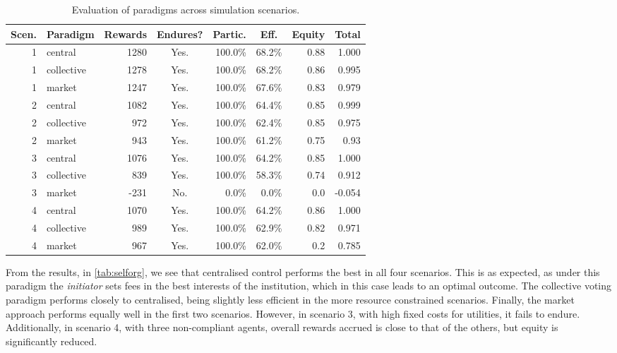 \begin{table}
\centering
\caption[Evaluation of paradigms across simulation scenarios.]{Evaluation of paradigms across simulation scenarios.}\label{tab:selforg}
\begin{tabular}{rl|rcrrr|r}
\multicolumn{1}{c}{Scen.} & Paradigm & \multicolumn{1}{c}{Rewards} & \multicolumn{1}{c}{Endures?} & \multicolumn{1}{c}{Partic.} & \multicolumn{1}{c}{Eff.} & Equity & \multicolumn{1}{c}{Total} \\
\hline \hline
1 & central & 1280 & Yes. & 100.0\% & 68.2\% & 0.88 & 1.000 \\
1 & collective & 1278 & Yes. & 100.0\% & 68.2\% & 0.86 & 0.995 \\
1 & market & 1247 & Yes. & 100.0\% & 67.6\% & 0.83 & 0.979 \\
\hline
2 & central & 1082 & Yes. & 100.0\% & 64.4\% & 0.85 & 0.999 \\
2 & collective & 972 & Yes. & 100.0\% & 62.4\% & 0.85 & 0.975 \\
2 & market & 943 & Yes. & 100.0\% & 61.2\% & 0.75 & 0.93 \\
\hline
3 & central & 1076 & Yes. & 100.0\% & 64.2\% & 0.85 & 1.000 \\
3 & collective & 839 & Yes. & 100.0\% & 58.3\% & 0.74 & 0.912 \\
3 & market & -231 & No. & 0.0\% & 0.0\% & 0.0 & -0.054 \\
\hline
4 & central & 1070 & Yes. & 100.0\% & 64.2\% & 0.86 & 1.000 \\
4 & collective & 989 & Yes. & 100.0\% & 62.9\% & 0.82 & 0.971 \\
4 & market & 967 & Yes. & 100.0\% & 62.0\% & 0.2 & 0.785 \\
\end{tabular}
\end{table}

From the results, in \autoref{tab:selforg}, we see that centralised control
performs the best in all four scenarios. This is as expected, as under this
paradigm the \emph{initiator} sets fees in the best interests of the institution,
which in this case leads to an optimal outcome. The collective voting paradigm
performs closely to centralised, being slightly less efficient in the more
resource constrained scenarios. Finally, the market approach performs equally
well in the first two scenarios. However, in scenario 3, with high fixed costs
for utilities, it fails to endure. Additionally, in scenario 4, with three
non-compliant agents, overall rewards accrued is close to that of the others,
but equity is significantly reduced.

